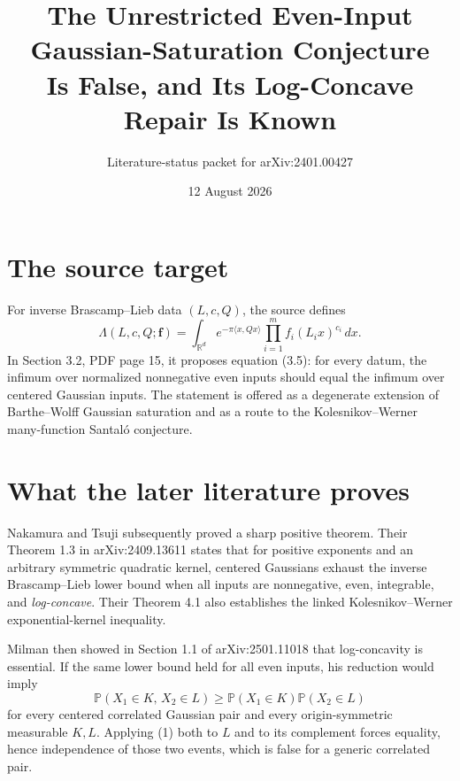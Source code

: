 \documentclass[11pt]{article}
\title{The Unrestricted Even-Input Gaussian-Saturation Conjecture\\
Is False, and Its Log-Concave Repair Is Known}
\author{Literature-status packet for arXiv:2401.00427}
\date{12 August 2026}
\begin{document}
\maketitle

\begin{center}
\end{center}

\section{The source target}

For inverse Brascamp--Lieb data $(L,c,Q)$, the source defines
\[
 \Lambda(L,c,Q;\mathbf f)
 =\int_{\mathbb R^d}e^{-\pi\langle x,Qx\rangle}
   \prod_{i=1}^m f_i(L_i x)^{c_i}\,dx.
\]
In Section 3.2, PDF page 15, it proposes equation (3.5): for every datum,
the infimum over normalized nonnegative even inputs should equal the infimum
over centered Gaussian inputs.  The statement is offered as a degenerate
extension of Barthe--Wolff Gaussian saturation and as a route to the
Kolesnikov--Werner many-function Santal\'o conjecture.

\section{What the later literature proves}

Nakamura and Tsuji subsequently proved a sharp positive theorem.  Their
Theorem 1.3 in arXiv:2409.13611 states that for positive exponents and an
arbitrary symmetric quadratic kernel, centered Gaussians exhaust the
inverse Brascamp--Lieb lower bound when all inputs are nonnegative, even,
integrable, and \emph{log-concave}.  Their Theorem 4.1 also establishes the
linked Kolesnikov--Werner exponential-kernel inequality.

Milman then showed in Section 1.1 of arXiv:2501.11018 that log-concavity is
essential.  If the same lower bound held for all even inputs, his reduction
would imply
\[
 \mathbb P(X_1\in K,\,X_2\in L)
 \geq \mathbb P(X_1\in K)\mathbb P(X_2\in L)             \tag{1}
\]
for every centered correlated Gaussian pair and every origin-symmetric
measurable $K,L$.  Applying (1) both to $L$ and to its complement forces
equality, hence independence of those two events, which is false for a
generic correlated pair.
\end{document}
